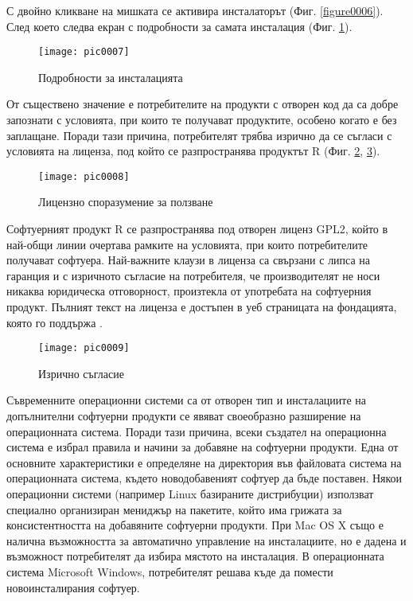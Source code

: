 С двойно кликване на мишката се активира инсталаторът (Фиг. \ref{figure0006}). След което следва екран с подробности за самата инсталация (Фиг. \ref{figure0007}).

\begin{figure}[h]
  \centering
  \texttt{[image: pic0007]}
  \caption{Подробности за инсталацията}
\label{figure0007}
\end{figure}
\FloatBarrier

От съществено значение е потребителите на продукти с отворен код да са добре запознати с условията, при които те получават продуктите, особено когато е без заплащане. Поради тази причина, потребителят трябва изрично да се съгласи с условията на лиценза, под който се разпространява продуктът R (Фиг. \ref{figure0008}, \ref{figure0009}).

\begin{figure}[h]
  \centering
  \texttt{[image: pic0008]}
  \caption{Лицензно споразумение за ползване}
\label{figure0008}
\end{figure}
\FloatBarrier

Софтуерният продукт R се разпространява под отворен лиценз GPL2, който в най-общи линии очертава рамките на условията, при които потребителите получават софтуера. Най-важните клаузи в лиценза са свързани с липса на гаранция и с изричното съгласие на потребителя, че производителят не носи никаква юридическа отговорност, произтекла от употребата на софтуерния продукт. Пълният текст на лиценза е достъпен в уеб страницата на фондацията, която го поддържа \cite{gpl2}.

\begin{figure}[h]
  \centering
  \texttt{[image: pic0009]}
  \caption{Изрично съгласие}
\label{figure0009}
\end{figure}
\FloatBarrier

Съвременните операционни системи са от отворен тип и инсталациите на допълнителни софтуерни продукти се явяват своеобразно разширение на операционната система. Поради тази причина, всеки създател на операционна система е избрал правила и начини за добавяне на софтуерни продукти. Една от основните характеристики е определяне на директория във файловата система на операционната система, където новодобавеният софтуер да бъде поставен. Някои операционни системи (например Linux базираните дистрибуции) използват специално организиран мениджър на пакетите, който има грижата за консистентността на добавяните софтуерни продукти. При Mac OS X също е налична възможността за автоматично управление на инсталациите, но е дадена и възможност потребителят да избира мястото на инсталация. В операционната система Microsoft Windows, потребителят решава къде да помести новоинсталирания софтуер.

